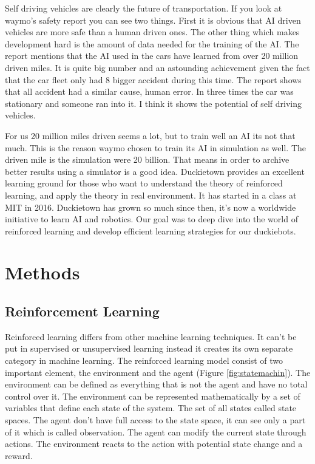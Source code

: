 \documentclass{article}
\begin{document}
Self driving vehicles are clearly the future of transportation. If you look at waymo's \cite{waymo}  safety report you can see two things. First it is obvious that AI driven vehicles are more safe than a human driven ones. The other thing which makes development hard is the amount of data needed for the training of the AI. 
The report mentions that the AI used in the cars have learned from over 20 million driven miles. It is quite big number and an astounding achievement given the fact that the car fleet only had 8 bigger accident during this time. The report shows that all accident had a similar cause, human error. In three times the car was stationary and someone ran into it. I think it shows the potential of self driving vehicles.

For us 20 million miles driven seems a lot, but to train well an AI its not that much. This is the reason waymo chosen to train its AI in simulation as well. The driven mile is the simulation were 20 billion. That means in order to archive better results using a simulator is a good idea. Duckietown provides an excellent learning ground for those who want to understand the theory of reinforced learning, and apply the theory in real environment. 
It has started in a class at MIT in 2016. Duckietown has grown so much since then, it's now a worldwide initiative to learn AI and robotics. Our goal was to deep dive into the world of reinforced learning and develop efficient learning strategies for our duckiebots.

\section{\large{Methods}}

\subsection{\normalsize{Reinforcement Learning}}

Reinforced learning differs from other machine learning techniques. It can't be put in supervised or unsupervised learning instead it creates its own separate category in machine learning. The reinforced learning model consist of two important element, the environment and the agent (Figure \ref{fig:statemachin}). The environment can be defined as everything that is not the agent and have no total control over it. The environment can be represented mathematically by a set of variables that define each state of the system. The set of all states called state spaces. The agent don't have full access to the state space, it can see only a part of it which is called observation. The agent can modify the current state through actions. The environment reacts to the action with potential state change and a reward.
\end{document}
